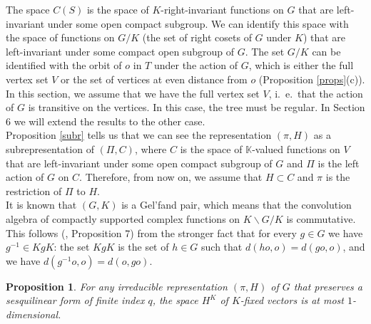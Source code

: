 \documentclass{article}
\theoremstyle{definition}
\theoremstyle{remark}
\theoremstyle{plain}
\newtheorem{prp}[dfn]{Proposition}
\begin{document}
The space $C(S)$ is the space of $K$-right-invariant functions on $G$ that are left-invariant under some open compact subgroup. We can identify this space with the space of functions on $G/K$ (the set of right cosets of $G$ under $K$) that are left-invariant under some compact open subgroup of $G$. The set $G/K$ can be identified with the orbit of $o$ in $T$ under the action of $G$, which is either the full vertex set $V$ or the set of vertices at even distance from $o$ (Proposition \ref{props}(c)). \\

In this section, we assume that we have the full vertex set $V$, i.~e.~that the action of $G$ is transitive on the vertices. In this case, the tree must be regular. In Section 6 we will extend the results to the other case. \\

Proposition \ref{subr} tells us that we can see the representation $(\pi,H)$ as a subrepresentation of $(\Pi,C)$, where $C$ is the space of $\mathbb{K}$-valued functions on $V$ that are left-invariant under some open compact subgroup of $G$ and $\Pi$ is the left action of $G$ on $C$. Therefore, from now on, we assume that $H\subset C$ and $\pi$ is the restriction of $\Pi$ to $H$. \\

It is known that $(G,K)$ is a Gel'fand pair, which means that the convolution algebra of compactly supported complex functions on $K\backslash G/K$ is commutative. This follows (\cite{amann}, Proposition 7) from the stronger fact that for every $g\in G$ we have $g^{-1}\in KgK$: the set $KgK$ is the set of $h\in G$ such that $d(ho,o)=d(go,o)$, and we have $d(g^{-1}o,o)=d(o,go)$. \\

\begin{prp} \label{gelfand}
For any irreducible representation $(\pi,H)$ of $G$ that preserves a sesquilinear form of finite index $q$, the space $H^K$ of $K$-fixed vectors is at most $1$-dimensional.
\end{prp}
\end{document}
